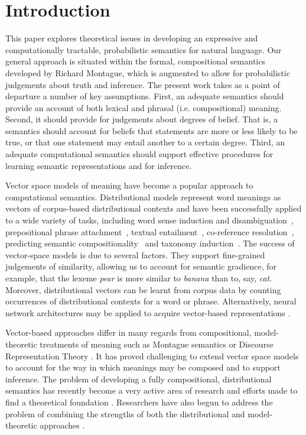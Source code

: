 \documentclass[a4paper,11pt]{article}
\renewcommand{\cite}{\citep}
\theoremstyle{definition}
\begin{document}
\section{Introduction}

This paper explores theoretical  issues in developing an expressive and computationally tractable, probabilistic semantics for natural language.  Our general approach is situated within the formal, compositional semantics developed by Richard Montague, which is augmented to allow for probabilistic judgements about truth and inference. The present work takes  as a point of departure a number of key assumptions.
First, an adequate semantics should provide an account of both lexical and phrasal (i.e. compositional) meaning. Second, it should provide for judgements about degrees of belief. That is, a semantics should account for beliefs that statements are more or less likely to be true, or that one statement may entail another to a certain degree. Third, an adequate computational semantics should support effective procedures for learning semantic representations and for inference.

Vector space models of meaning have become a popular approach to computational semantics.
Distributional models represent word meanings as vectors of corpus-based distributional contexts and have been successfully applied to a wide variety of tasks, including word sense induction and disambiguation~\cite{khapra-EtAl:2010:ACL,Baskaya:13}, prepositional phrase attachment~\cite{Calvo05distributionalthesaurus}, textual entailment~\cite{Marelli:14}, co-reference resolution~\cite{lee-EtAl:2012:EMNLP-CoNLL}, predicting semantic compositionality~\cite{bergsma-EtAl:2010:EMNLP} and taxonomy induction~\cite{fountain-lapata:2012:NAACL-HLT}. 
The success of vector-space models is due to several factors. They support fine-grained judgements of similarity, allowing us to account for semantic gradience, for example, that the lexeme {\em pear} is more similar to {\em banana}  than to, say, {\em cat}. Moreover, distributional vectors can be learnt from corpus data by counting occurrences of distributional contexts for a word or phrase.  Alternatively, neural network architectures may be applied to acquire vector-based representations \cite{Socher:12,Mikolov:13}. 

Vector-based approaches differ in many regards from compositional, model-theoretic treatments of meaning such as Montague semantics or Discourse Representation Theory \cite{Kamp:93}. It has proved challenging to extend vector space models to account for the way in which meanings may be composed and to support inference. The problem of developing a fully compositional, distributional semantics has recently become a very active area of research  \cite{Widdows:08,Mitchell:08,Baroni2010,Garrette:11,Grefenstette:11,Socher:12,Lewis:13} and efforts made to find a theoretical foundation \cite{Clarke:12,Kartsaklis:14}.  Researchers have also begun to address the problem of combining the strengths of both the distributional and model-theoretic approaches \cite{Clarke:07,Coecke:10,Garrette:11,Lewis:13}. 
\end{document}
